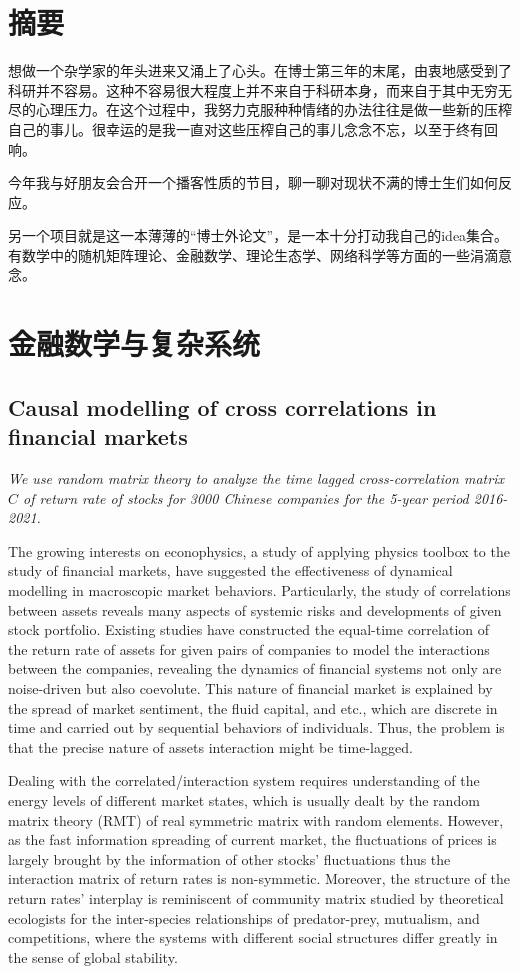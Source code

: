 \chapter*{摘要}

想做一个杂学家的年头进来又涌上了心头。在博士第三年的末尾，由衷地感受到了科研并不容易。这种不容易很大程度上并不来自于科研本身，而来自于其中无穷无尽的心理压力。在这个过程中，我努力克服种种情绪的办法往往是做一些新的压榨自己的事儿。很幸运的是我一直对这些压榨自己的事儿念念不忘，以至于终有回响。

今年我与好朋友会合开一个播客性质的节目，聊一聊对现状不满的博士生们如何反应。

另一个项目就是这一本薄薄的“博士外论文”，是一本十分打动我自己的idea集合。有数学中的随机矩阵理论、金融数学、理论生态学、网络科学等方面的一些涓滴意念。

\chapter{金融数学与复杂系统}


\section{Causal modelling of cross correlations in financial markets}

\textit{
    We use random matrix theory to analyze the time lagged cross-correlation matrix $C$ of return rate of stocks for 3000 Chinese companies for the 5-year period 2016-2021. 
}

The growing interests on econophysics, a study of applying physics toolbox to the study of financial markets, have suggested the effectiveness of dynamical modelling in macroscopic market behaviors. Particularly, the study of correlations between assets reveals many aspects of systemic risks and developments of given stock portfolio. Existing studies have constructed the equal-time correlation of the return rate of assets for given pairs of companies to model the interactions between the companies, revealing the dynamics of financial systems not only are noise-driven but also coevolute. This nature of financial market is explained by the spread of market sentiment, the fluid capital, and etc., which are discrete in time and carried out by sequential behaviors of individuals. Thus, the problem is that the precise nature of assets interaction might be time-lagged.

Dealing with the correlated/interaction system requires understanding of the energy levels of different market states, which is usually dealt by the random matrix theory (RMT) of real symmetric matrix with random elements. However, as the fast information spreading of current market, the fluctuations of prices is largely brought by the information of other stocks' fluctuations thus the interaction matrix of return rates is non-symmetic. Moreover, the structure of the return rates' interplay is reminiscent of community matrix studied by theoretical ecologists for the inter-species relationships of predator-prey, mutualism, and competitions, where the systems with different social structures differ greatly in the sense of global stability.

